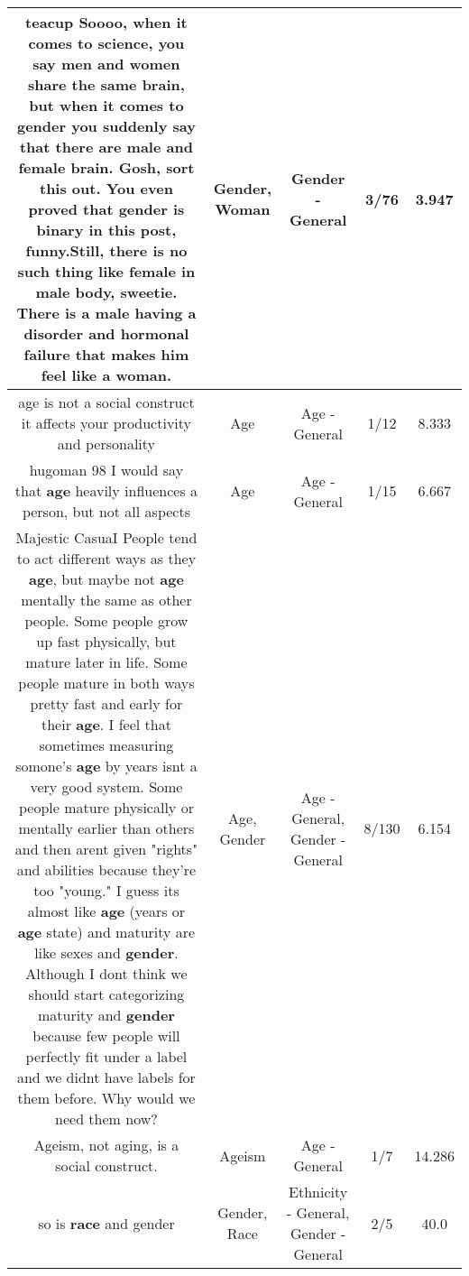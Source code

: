 \documentclass[11pt]{article}
\newlength\mylength
\begin{document}
\begin{center}
\begin{longtable}{|C{.65\mylength}|C{.30\mylength}|C{.12\mylength}|C{.12\mylength}|C{.12\mylength}|}
  \small teacup Soooo, when it comes to science, you say men and women share the same brain, but when it comes to \textbf{gender} you suddenly say that there are male and female brain. Gosh, sort this out. You even proved that \textbf{gender} is binary in this post, funny.Still, there is no such thing like female in male body, sweetie. There is a male having a disorder and hormonal failure that makes him feel like a \textbf{woman}.\normalsize   & Gender, Woman & Gender - General & 3/76 & 3.947 \\  \hline
  \small age is not  a social construct it affects your productivity and personality\normalsize   & Age & Age - General & 1/12 & 8.333 \\  \hline
  \small hugoman 98 I would say that \textbf{age} heavily influences a person, but not all aspects\normalsize   & Age & Age - General & 1/15 & 6.667 \\  \hline
  \small Majestic CasuaI People tend to act different ways as they \textbf{age}, but maybe not \textbf{age} mentally the same as other people. Some people grow up fast physically, but mature later in life. Some people mature in both ways pretty fast and early for their \textbf{age}. I feel that sometimes measuring somone's \textbf{age} by years isnt a very good system. Some people mature physically or mentally earlier than others and then arent given "rights" and abilities because they're too "young." I guess its almost like \textbf{age} (years or \textbf{age} state) and maturity are like sexes and \textbf{gender}. Although I dont think we should start categorizing maturity and \textbf{gender} because few people will perfectly fit under a label and we didnt have labels for them before. Why would we need them now?\normalsize   & Age, Gender & Age - General, Gender - General & 8/130 & 6.154 \\  \hline
  \small Ageism, not aging, is a social construct.\normalsize   & Ageism & Age - General & 1/7 & 14.286 \\  \hline
  \small so is \textbf{race} and gender\normalsize   & Gender, Race & Ethnicity - General, Gender - General & 2/5 & 40.0 \\  \hline

\end{longtable}
\end{center}
\end{document}
